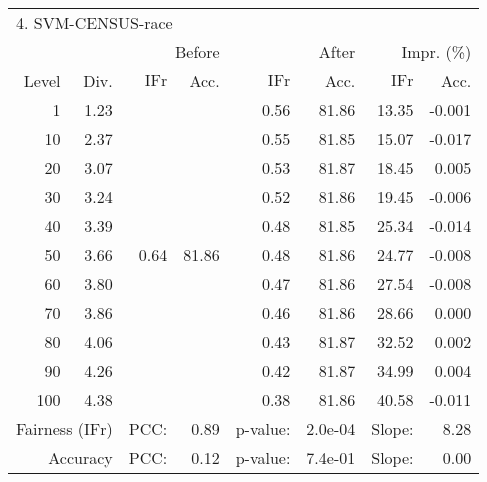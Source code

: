 \begin{tabular}{rr||rr|rr|rr}
\multicolumn{4}{l}{4. SVM-CENSUS-race} & \multicolumn{2}{c}{} & \multicolumn{2}{c}{}\\
 &  & \multicolumn{2}{r|}{Before} & \multicolumn{2}{r|}{After} & \multicolumn{2}{r}{Impr. (\%)}\\
Level & Div. & $\mathrm{IFr}$ & Acc. & $\mathrm{IFr}$ & Acc. & $\mathrm{IFr}$ & Acc.\\
\hline
1 & 1.23 & \multirow{11}{*}{0.64} & \multirow{11}{*}{81.86} & 0.56 & 81.86 & 13.35 & -0.001\\
10 & 2.37 &  &  & 0.55 & 81.85 & 15.07 & -0.017\\
20 & 3.07 &  &  & 0.53 & 81.87 & 18.45 & 0.005\\
30 & 3.24 &  &  & 0.52 & 81.86 & 19.45 & -0.006\\
40 & 3.39 &  &  & 0.48 & 81.85 & 25.34 & -0.014\\
50 & 3.66 &  &  & 0.48 & 81.86 & 24.77 & -0.008\\
60 & 3.80 &  &  & 0.47 & 81.86 & 27.54 & -0.008\\
70 & 3.86 &  &  & 0.46 & 81.86 & 28.66 & 0.000\\
80 & 4.06 &  &  & 0.43 & 81.87 & 32.52 & 0.002\\
90 & 4.26 &  &  & 0.42 & 81.87 & 34.99 & 0.004\\
100 & 4.38 &  &  & 0.38 & 81.86 & 40.58 & -0.011\\
\hline
\multicolumn{2}{r}{Fairness ($\mathrm{IFr}$)} & PCC: & \multicolumn{1}{r}{0.89} & p-value:  & \multicolumn{1}{r}{2.0e-04} & Slope:  & 8.28\\
\multicolumn{2}{r}{Accuracy} & PCC: & \multicolumn{1}{r}{0.12} & p-value:  & \multicolumn{1}{r}{7.4e-01} & Slope:  & 0.00\\
\end{tabular}
